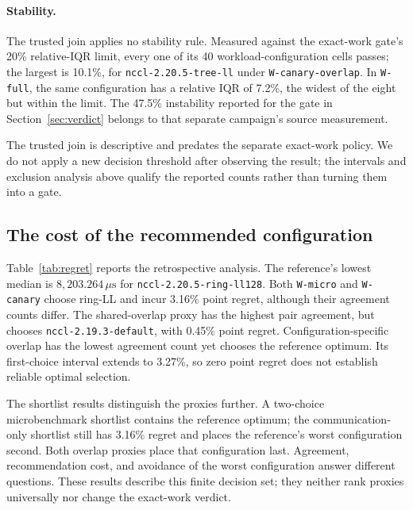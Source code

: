 \documentclass[10pt,twocolumn]{article}
\newcommand{\wname}[1]{\texttt{W-#1}}
\newcommand{\us}{\,\mu\mathrm{s}}
\begin{document}
\paragraph{Stability.} The trusted join applies no stability rule. Measured
against the exact-work gate's 20\% relative-IQR limit, every one of its 40
workload-configuration cells passes; the largest is 10.1\%, for
\texttt{nccl-2.20.5-tree-ll} under \wname{canary-overlap}. In \wname{full},
the same configuration has a relative IQR of 7.2\%, the widest of the eight but
within the limit. The 47.5\% instability reported for the gate in
Section~\ref{sec:verdict} belongs to that separate campaign's source
measurement.

The trusted join is descriptive and predates the separate exact-work policy.
We do not apply a new decision threshold after observing the result; the
intervals and exclusion analysis above qualify the reported counts rather than
turning them into a gate.

\subsection{The cost of the recommended configuration}

Table~\ref{tab:regret} reports the retrospective analysis. The reference's
lowest median is $8{,}203.264\us$ for \texttt{nccl-2.20.5-ring-ll128}.
Both \wname{micro} and \wname{canary} choose ring-LL and incur 3.16\% point
regret, although their agreement counts differ. The shared-overlap proxy has
the highest pair agreement, but chooses \texttt{nccl-2.19.3-default}, with
0.45\% point regret. Configuration-specific overlap has the lowest agreement
count yet chooses the reference optimum. Its first-choice interval extends
to 3.27\%, so zero point regret does not establish reliable optimal selection.

The shortlist results distinguish the proxies further. A
two-choice microbenchmark shortlist contains the reference optimum; the
communication-only shortlist still has 3.16\% regret and places the reference's
worst configuration second. Both overlap proxies place that configuration
last. Agreement, recommendation cost, and avoidance of the worst configuration
answer different questions. These results describe this finite decision set;
they neither rank proxies universally nor change the exact-work verdict.

\begin{table}[t]
\caption{Retrospective decision regret on the retained trusted join. Lower
regret is better. $r_2$ and $r_3$ use the best reference result in each proxy's
shortlist. Intervals describe $r_1$ only. Worst rank is the proxy's position
for the full workload's slowest configuration (8 is last).}
\label{tab:regret}
\centering\small

\end{table}
\end{document}
